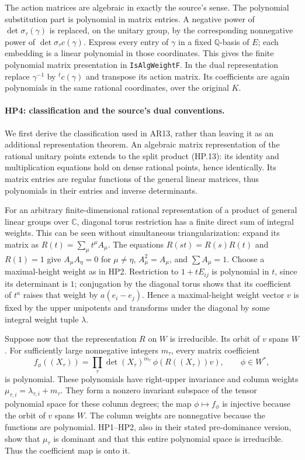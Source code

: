 The action matrices are algebraic in exactly the source's sense.
The polynomial substitution part is polynomial in matrix entries.
A negative power of $\det\sigma_\tau(\gamma)$ is replaced, on the
unitary group, by the corresponding nonnegative power of
$\det\sigma_\tau c(\gamma)$.  Express every entry of $\gamma$ in a
fixed $\mathbb Q$-basis of $E$; each embedding is a linear polynomial
in those coordinates.  This gives the finite polynomial matrix
presentation in \texttt{IsAlgWeightF}.  In the dual representation
replace $\gamma^{-1}$ by ${}^t c(\gamma)$ and transpose its action
matrix.  Its coefficients are again polynomials in the same rational
coordinates, over the original $K$.

\paragraph{HP4: classification and the source's dual conventions.}
\label{claim:HP4}
We first derive the classification used in AR13, rather than leaving
it as an additional representation theorem.  An algebraic matrix
representation of the rational unitary points extends to the split
product (HP.13): its identity and multiplication equations hold on
dense rational points, hence identically.  Its matrix entries are
regular functions of the general linear matrices, thus polynomials
in their entries and inverse determinants.

For an arbitrary finite-dimensional rational representation of a
product of general linear groups over $\mathbb C$, diagonal torus
restriction has a finite direct sum of integral weights.  This can
be seen without simultaneous triangularization: expand its matrix
as $R(t)=\sum_\mu t^\mu A_\mu$.  The equations
$R(st)=R(s)R(t)$ and $R(1)=1$ give
$A_\mu A_\eta=0$ for $\mu\ne\eta$, $A_\mu^2=A_\mu$, and
$\sum A_\mu=1$.  Choose a maximal-height weight as in HP2.
Restriction to $1+tE_{ij}$ is polynomial in $t$, since its determinant
is $1$; conjugation by the diagonal torus shows that its coefficient
of $t^a$ raises that weight by $a(e_i-e_j)$.  Hence a maximal-height
weight vector $v$ is fixed by the upper unipotents and transforms
under the diagonal by some integral weight tuple $\lambda$.

Suppose now that the representation $R$ on $W$ is irreducible.
Its orbit of $v$ spans $W$.  For sufficiently large nonnegative
integers $m_\tau$, every matrix coefficient
\[
 f_\phi((X_\tau))=
       \prod_\tau\det(X_\tau)^{m_\tau}\,
                  \phi(R((X_\tau))v),\qquad \phi\in W^*,
 \tag{HP.14}
\]
is polynomial.  These polynomials have right-upper invariance and
column weights $\mu_{\tau,i}=\lambda_{\tau,i}+m_\tau$.
They form a nonzero invariant subspace of the tensor polynomial
space for these column degrees; the map $\phi\mapsto f_\phi$ is
injective because the orbit of $v$ spans $W$.
The column weights are nonnegative because the functions are
polynomial.  HP1--HP2, also in their stated pre-dominance version,
show that $\mu_\tau$ is dominant and that this entire polynomial
space is irreducible.  Thus the coefficient map is onto it.

